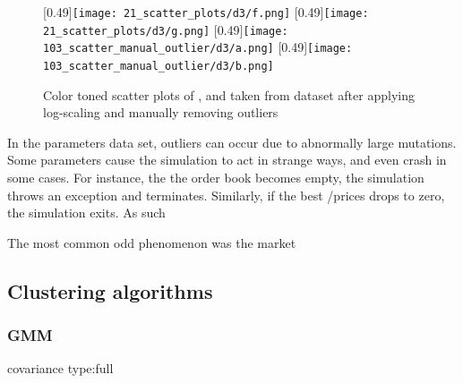 \begin{figure}\label{figure:scatter_log_transform}
[0.49\linewidth]{\texttt{[image: 21\_scatter\_plots/d3/f.png]}}
[0.49\linewidth]{\texttt{[image: 21\_scatter\_plots/d3/g.png]}}
[0.49\linewidth]{\texttt{[image: 103\_scatter\_manual\_outlier/d3/a.png]}}
[0.49\linewidth]{\texttt{[image: 103\_scatter\_manual\_outlier/d3/b.png]}}
\caption{Color toned scatter plots of \timetoreachnewfundamental, \stdev and \roundstable taken from dataset \dthree after applying log-scaling and manually removing outliers}
\end{figure}


In the parameters data set, outliers can occur due to abnormally large mutations. 
Some parameters cause the simulation to act in strange ways, and even crash in some cases. For instance, the the order book becomes empty, the simulation throws an exception and terminates. Similarly, if the best \bid/\ask prices drops to zero, the simulation exits. As such 

The most common odd phenomenon was the market 




\subsection{Clustering algorithms}
\subsubsection{GMM}
covariance type:full
